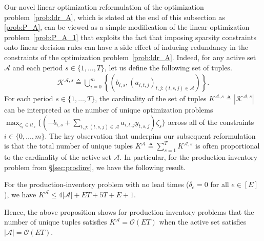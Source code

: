 \documentclass[nonblindrev,mnsc]{informs3} %
\begin{document}
 Our novel linear optimization reformulation of the optimization problem~\eqref{prob:ldr_A}, which is stated at the end of this subsection as \eqref{prob:P_A},  can be viewed as a simple modification of the linear optimization problem~\eqref{prob:P_A_1} that   exploits the fact that imposing sparsity constraints onto linear decision rules can have a side effect of inducing redundancy in the constraints of the optimization problem~\eqref{prob:ldr_A}. 
 Indeed, for any active set $\mathcal{A}$ and each period $s \in \{1,\ldots,T\}$, let us define the following set of tuples.
\begin{align*}
    \mathcal{K}^{\mathcal{A},s} \triangleq \bigcup_{i=0}^m \left\{  \left(b_{i,s}, \left( a_{i,t,j} \right)_{t,j: (t,s,j) \in \mathcal{A}}\right)  \right \}. 
\end{align*}
 For each period $s \in \{1,\ldots,T\}$, the cardinality of the set of tuples $K^{\mathcal{A},s} \triangleq | \mathcal{K}^{\mathcal{A},s}|$ can be interpreted as the number of unique  optimization problems $\max_{\zeta_s \in \mathcal{U}_s}  \{ ( - b_{i,s} + \sum_{t,j: (t,s,j) \in \mathcal{A}} a_{i,t,j} y_{t,s,j} ) \zeta_s  \}$ across all of the constraints $i \in \{0,\ldots,m\}$. The key observation that underpins our subsequent reformulation is that the total number of unique tuples $K^{\mathcal{A}} \triangleq \sum_{s=1}^{T} K^{\mathcal{A},s}$ is often proportional to the cardinality of the active set $\mathcal{A}$. In particular, for the production-inventory problem from \S\ref{sec:prodinv}, we have the following result.  \begin{proposition} \label{prop:productioninventory_reformulation}
For the production-inventory problem with no lead times ($\delta_e = 0$ for all $e \in [E]$), we have  $ K^{\mathcal{A}} \le  4 | \mathcal{A}| + ET + 5T + E + 1$. 
\end{proposition}
Hence, the above proposition shows for production-inventory problems that the number of unique tuples satisfies $K^{\mathcal{A}} = \mathcal{O}(ET)$  when the active set satisfies $|\mathcal{A}|= \mathcal{O}(ET)$. 

 
\end{document}
